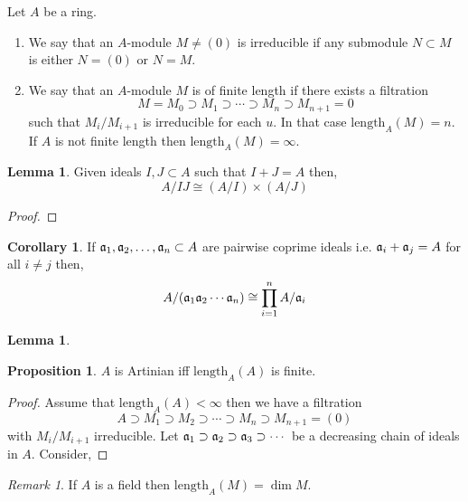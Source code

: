 \documentclass[12pt]{article}
\theoremstyle{remark}
\newtheorem*{remark}{Remark}
\theoremstyle{definition}
\newtheorem{lemma}[theorem]{Lemma}
\newtheorem{proposition}[theorem]{Proposition}
\newtheorem{corollary}[theorem]{Corollary}
\newenvironment{definition}[1][Definition:]{\begin{trivlist}
\item[\hskip \labelsep {\bfseries #1}]}{\end{trivlist}}
\begin{document}
\newcommand{\len}[2]{\mathrm{length}_{#1}\left(#2\right)}

\begin{definition}
Let $A$ be a ring. 
\begin{enumerate}
\item We say that an $A$-module $M \neq (0)$ is irreducible if any submodule $N \subset M$ is either $N = (0)$ or $N = M$. 
\item We say that an $A$-module $M$ is of finite length if there exists a filtration
\[M = M_0 \supset M_1 \supset \cdots \supset M_{n} \supset M_{n+1} = 0\]
such that $M_i / M_{i+1}$ is irreducible for each $u$. In that case $\len{A}{M} = n$. If $A$ is not finite length then $\len{A}{M} = \infty$.
\end{enumerate}
\end{definition}

\begin{lemma}
Given ideals $I, J \subset A$ such that $I + J = A$ then,
\[ A / IJ \cong (A / I) \times (A / J) \]
\end{lemma}

\begin{proof}

\end{proof}

\begin{corollary}
If $\mathfrak{a}_1, \mathfrak{a}_2, \dots, \mathfrak{a}_n \subset A$ are pairwise coprime ideals i.e. $\mathfrak{a}_i + \mathfrak{a}_j = A$ for all $i \neq j$ then,
\[ A / (\mathfrak{a}_1 \mathfrak{a}_2 \cdots \mathfrak{a}_n) \cong \prod_{i = 1}^n A / \mathfrak{a}_i \]
\end{corollary}

\begin{lemma}

\end{lemma}

\begin{proposition}
$A$ is Artinian iff $\len{A}{A}$ is finite.
\end{proposition}

\begin{proof}
Assume that $\len{A}{A} < \infty$ then we have a filtration
\[ A \supset M_1 \supset M_2 \supset \cdots \supset M_n \supset M_{n + 1}  = (0) \]
with $M_i / M_{i+1}$ irreducible. Let $\mathfrak{a}_1 \supset \mathfrak{a}_2 \supset \mathfrak{a}_3 \supset \cdots$ be a decreasing chain of ideals in $A$. Consider, 
\end{proof}

\begin{remark}
If $A$ is a field then $\len{A}{M} = \dim{M}$. 
\end{remark}
\end{document}
